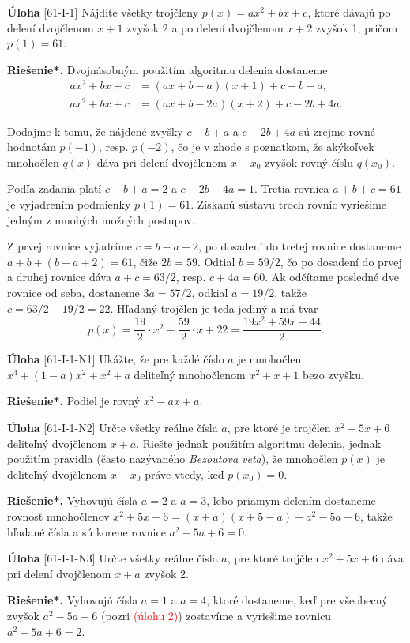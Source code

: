 \documentclass{article}
\newcommand{\rieh}{\textbf{Riešenie*.} }
\newcommand\todo[1]{\noindent\textcolor{red}{(#1)}}
\newcommand{\problem}[3]{
  \begin{tcolorbox}[breakable,notitle,boxrule=0pt,colback=light-gray,colframe=light-gray]
    \textbf{Úloha}
    [#1] #2
  \end{tcolorbox}
  \noindent#3
}
\begin{document}
\problem{61-I-1}{
Nájdite všetky trojčleny $p(x) = ax^2 + bx + c$, ktoré dávajú po delení dvojčlenom $x + 1$ zvyšok 2 a po delení dvojčlenom $x + 2$ zvyšok 1, pričom $p(1) = 61$. 
}{
\rieh Dvojnásobným použitím algoritmu delenia dostaneme
\begin{align*}
    ax^2+ bx + c &= (ax + b - a)(x + 1) + c - b + a,\\
    ax^2+ bx + c &= (ax + b - 2a)(x + 2) + c - 2b + 4a.
\end{align*}

Dodajme k tomu, že nájdené zvyšky $c - b + a$ a $c - 2b + 4a$ sú zrejme rovné hodnotám $p(-1)$, resp. $p(-2)$, čo je v zhode s poznatkom, že akýkoľvek mnohočlen $q(x)$ dáva pri delení dvojčlenom $x - x_0$ zvyšok rovný číslu $q(x_0)$.

Podľa zadania platí $c - b + a = 2$ a $c - 2b + 4a = 1$. Tretia rovnica $a + b + c = 61$ je vyjadrením podmienky $p(1) = 61$. Získanú sústavu troch rovníc vyriešime jedným z mnohých možných postupov.

Z prvej rovnice vyjadríme $c = b - a + 2$, po dosadení do tretej rovnice dostaneme $a + b + (b - a + 2) = 61$, čiže $2b = 59$. Odtiaľ $b = 59/2$, čo po dosadení do prvej a druhej rovnice dáva $a+c = 63/2$, resp. $c+4a = 60$. Ak odčítame posledné dve rovnice od seba, dostaneme $3a = 57/2$, odkiaľ $a = 19/2$, takže $c = 63/2 - 19/2 = 22$. Hľadaný trojčlen je teda jediný a má tvar
$$p(x) =\frac{19}{2} \cdot x^2+\frac{59}{2}\cdot x + 22 = \frac{19x^2 + 59x + 44}{2}.$$
}


\problem{61-I-1-N1}{
Ukážte, že pre každé číslo $a$ je mnohočlen $x^4+(1-a)x^2+x^2+a$ deliteľný mnohočlenom $x^2+ x + 1$ bezo zvyšku.
}{
\rieh Podiel je rovný $x^2 - ax + a$.
}

\problem{61-I-1-N2}{
Určte všetky reálne čísla $a$, pre ktoré je trojčlen $x^2+5x+6$ deliteľný dvojčlenom $x+a$. Riešte jednak použitím algoritmu delenia, jednak použitím pravidla (často nazývaného \textit{Bezoutova veta}), že mnohočlen $p(x)$ je deliteľný dvojčlenom $x - x_0$ práve vtedy, keď $p(x_0) = 0$.
}{
\rieh Vyhovujú čísla $a = 2$ a $a = 3$, lebo priamym delením dostaneme rovnosť mnohočlenov $x^2+ 5x + 6 = (x + a)(x + 5 - a) + a^2 - 5a + 6$, takže hľadané čísla a sú korene rovnice $a^2 - 5a + 6 = 0$.
}

\problem{61-I-1-N3}{
Určte všetky reálne čísla $a$, pre ktoré trojčlen $x^2+ 5x + 6$ dáva pri delení dvojčlenom $x + a$ zvyšok 2.
}{
\rieh Vyhovujú čísla $a = 1$ a $a = 4$, ktoré dostaneme, keď pre všeobecný zvyšok $a^2 - 5a + 6$ (pozri \todo{úlohu 2}) zostavíme a vyriešime rovnicu $a^2 - 5a + 6 = 2$.
}
\end{document}
